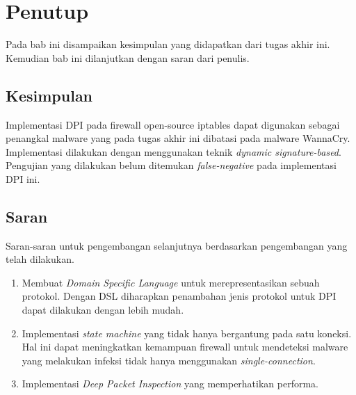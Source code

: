 \chapter{Penutup}

Pada bab ini disampaikan kesimpulan yang didapatkan dari tugas akhir ini. Kemudian bab ini dilanjutkan dengan saran dari penulis.

\section{Kesimpulan}

Implementasi DPI pada firewall open-source iptables dapat digunakan sebagai penangkal malware yang pada tugas akhir ini dibatasi pada malware WannaCry. Implementasi dilakukan dengan menggunakan teknik \textit{dynamic signature-based}. Pengujian yang dilakukan belum ditemukan \textit{false-negative} pada implementasi DPI ini.

\section{Saran}

Saran-saran untuk pengembangan selanjutnya berdasarkan pengembangan yang telah dilakukan.
\begin{enumerate}
	\item Membuat \textit{Domain Specific Language} untuk merepresentasikan sebuah protokol. Dengan DSL diharapkan penambahan jenis protokol untuk DPI dapat dilakukan dengan lebih mudah.
	\item Implementasi \textit{state machine} yang tidak hanya bergantung pada satu koneksi. Hal ini dapat meningkatkan kemampuan firewall untuk mendeteksi malware yang melakukan infeksi tidak hanya menggunakan \textit{single-connection}.
	\item Implementasi \textit{Deep Packet Inspection} yang memperhatikan performa.
\end{enumerate}